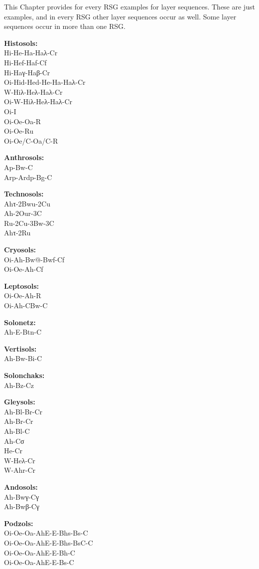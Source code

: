\documentclass[
  letterpaper,
  DIV=11,
  numbers=noendperiod]{scrreprt}
\begin{document}
This Chapter provides for every RSG examples for layer sequences. These
are just examples, and in every RSG other layer sequences occur as well.
Some layer sequences occur in more than one RSG.

\textbf{Histosols:}\\
Hi-He-Ha-Haλ-Cr\\
Hi-Hef-Haf-Cf\\
Hi-Haγ-Haβ-Cr\\
Oi-Hid-Hed-He-Ha-Haλ-Cr\\
W-Hiλ-Heλ-Haλ-Cr\\
Oi-W-Hiλ-Heλ-Haλ-Cr\\
Oi-I\\
Oi-Oe-Oa-R\\
Oi-Oe-Ru\\
Oi-Oe/C-Oa/C-R

\textbf{Anthrosols:}\\
Ap-Bw-C\\
Arp-Ardp-Bg-C

\textbf{Technosols:}\\
Ahτ-2Bwu-2Cu\\
Ah-2Our-3C\\
Ru-2Cu-3Bw-3C\\
Ahτ-2Ru

\textbf{Cryosols:}\\
Oi-Ah-Bw@-Bwf-Cf\\
Oi-Oe-Ah-Cf

\textbf{Leptosols:}\\
Oi-Oe-Ah-R\\
Oi-Ah-CBw-C

\textbf{Solonetz:}\\
Ah-E-Btn-C

\textbf{Vertisols:}\\
Ah-Bw-Bi-C

\textbf{Solonchaks:}\\
Ah-Bz-Cz

\textbf{Gleysols:}\\
Ah-Bl-Br-Cr\\
Ah-Br-Cr\\
Ah-Bl-C\\
Ah-Cσ\\
He-Cr\\
W-Heλ-Cr\\
W-Ahr-Cr

\textbf{Andosols:}\\
Ah-Bwγ-Cγ\\
Ah-Bwβ-Cγ

\textbf{Podzols:}\\
Oi-Oe-Oa-AhE-E-Bhs-Bs-C\\
Oi-Oe-Oa-AhE-E-Bhs-BsC-C\\
Oi-Oe-Oa-AhE-E-Bh-C\\
Oi-Oe-Oa-AhE-E-Bs-C
\end{document}
